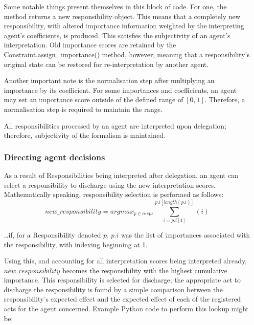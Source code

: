 Some notable things present themselves in this block of code. For one, the method returns a new responsibility object. This means that a completely new responsibility, with altered importance information weighted by the interpreting agent's coefficients, is produced. This satisfies the subjectivity of an agent's interpretation. Old importance scores are retained by the Constraint.assign\_importance() method, however, meaning that a responsibility's original state can be restored for re-interpretation by another agent.\par

Another important note is the normalisation step after multiplying an importance by its coefficient. For some importances and coefficients, an agent may set an importance score outside of the defined range of \([0,1]\). Therefore, a normalisation step is required to maintain the range.\par

All responsibilities processed by an agent are interpreted upon delegation; therefore, subjectivity of the formalism is maintained.\par

\subsubsection{Directing agent decisions}  %
As a result of Responsibilities being interpreted after delegation, an agent can select a responsibility to discharge using the new interpretation scores. Mathematically speaking, responsibility selection is performed as follows: \[new\_responsibility = argmax_{p \in resps} {\sum_{i=p.i[1]}^{p.i[length(p.i)]}(i)}\]

\ldots{}if, for a Responsibility denoted \(p\), \(p.i\) was the list of importances associated with the responsibility, with indexing beginning at 1.\par

Using this, and accounting for all interpretation scores being interpreted already, \(new\_responsibility\) becomes the responsibility with the highest cumulative importance. This responsibility is selected for discharge; the appropriate act to discharge the responsibility is found by a simple comparison between the responsibility's expected effect and the expected effect of each of the registered acts for the agent concerned. Example Python code to perform this lookup might be:

